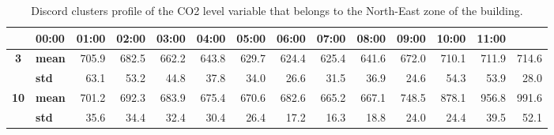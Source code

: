   
\begin{table}[htbp]
  \centering
  \scriptsize
  \caption{Discord clusters profile of the CO2 level variable that belongs to the North-East zone of the building.}
    \begin{tabular}{|c|l|r|r|r|r|r|r|r|r|r|r|r|r|}
    \hline
    \rowcolor[rgb]{ .553,  .706,  .886} \multicolumn{2}{|c|}{\textbf{Profile code}} & \textbf{00:00} & \textbf{01:00} & \textbf{02:00} & \textbf{03:00} & \textbf{04:00} & \textbf{05:00} & \textbf{06:00} & \textbf{07:00} & \textbf{08:00} & \textbf{09:00} & \textbf{10:00} & \textbf{11:00} \bigstrut\\
    \hline
    \rowcolor[rgb]{ .553,  .706,  .886} \textbf{3} & \textbf{mean} & \cellcolor[rgb]{ 1,  1,  1} 705.9 & \cellcolor[rgb]{ 1,  1,  1} 682.5 & \cellcolor[rgb]{ 1,  1,  1} 662.2 & \cellcolor[rgb]{ 1,  1,  1} 643.8 & \cellcolor[rgb]{ 1,  1,  1} 629.7 & \cellcolor[rgb]{ 1,  1,  1} 624.4 & \cellcolor[rgb]{ 1,  1,  1} 625.4 & \cellcolor[rgb]{ 1,  1,  1} 641.6 & \cellcolor[rgb]{ 1,  1,  1} 672.0 & \cellcolor[rgb]{ 1,  1,  1} 710.1 & \cellcolor[rgb]{ 1,  1,  1} 711.9 & \cellcolor[rgb]{ 1,  1,  1} 714.6 \bigstrut\\
\cline{2-14}    \rowcolor[rgb]{ .553,  .706,  .886}      & \textbf{std} & \cellcolor[rgb]{ 1,  1,  1} 63.1 & \cellcolor[rgb]{ 1,  1,  1} 53.2 & \cellcolor[rgb]{ 1,  1,  1} 44.8 & \cellcolor[rgb]{ 1,  1,  1} 37.8 & \cellcolor[rgb]{ 1,  1,  1} 34.0 & \cellcolor[rgb]{ 1,  1,  1} 26.6 & \cellcolor[rgb]{ 1,  1,  1} 31.5 & \cellcolor[rgb]{ 1,  1,  1} 36.9 & \cellcolor[rgb]{ 1,  1,  1} 24.6 & \cellcolor[rgb]{ 1,  1,  1} 54.3 & \cellcolor[rgb]{ 1,  1,  1} 53.9 & \cellcolor[rgb]{ 1,  1,  1} 28.0 \bigstrut\\
    \hline
    \rowcolor[rgb]{ .553,  .706,  .886} \textbf{10} & \textbf{mean} & \cellcolor[rgb]{ .851,  .851,  .851} 701.2 & \cellcolor[rgb]{ .851,  .851,  .851} 692.3 & \cellcolor[rgb]{ .851,  .851,  .851} 683.9 & \cellcolor[rgb]{ .851,  .851,  .851} 675.4 & \cellcolor[rgb]{ .851,  .851,  .851} 670.6 & \cellcolor[rgb]{ .851,  .851,  .851} 682.6 & \cellcolor[rgb]{ .851,  .851,  .851} 665.2 & \cellcolor[rgb]{ .851,  .851,  .851} 667.1 & \cellcolor[rgb]{ .851,  .851,  .851} 748.5 & \cellcolor[rgb]{ .851,  .851,  .851} 878.1 & \cellcolor[rgb]{ .851,  .851,  .851} 956.8 & \cellcolor[rgb]{ .851,  .851,  .851} 991.6 \bigstrut\\
\cline{2-14}    \rowcolor[rgb]{ .553,  .706,  .886}      & \textbf{std} & \cellcolor[rgb]{ .851,  .851,  .851} 35.6 & \cellcolor[rgb]{ .851,  .851,  .851} 34.4 & \cellcolor[rgb]{ .851,  .851,  .851} 32.4 & \cellcolor[rgb]{ .851,  .851,  .851} 30.4 & \cellcolor[rgb]{ .851,  .851,  .851} 26.4 & \cellcolor[rgb]{ .851,  .851,  .851} 17.2 & \cellcolor[rgb]{ .851,  .851,  .851} 16.3 & \cellcolor[rgb]{ .851,  .851,  .851} 18.8 & \cellcolor[rgb]{ .851,  .851,  .851} 24.0 & \cellcolor[rgb]{ .851,  .851,  .851} 24.4 & \cellcolor[rgb]{ .851,  .851,  .851} 39.5 & \cellcolor[rgb]{ .851,  .851,  .851} 52.1 \bigstrut\\

\end{tabular}
\end{table}
